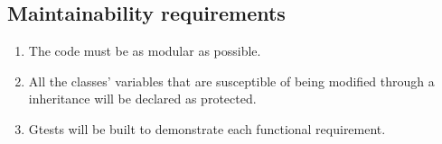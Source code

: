 \subsection{Maintainability requirements}
\begin{enumerate}[label=\textbf{MR\threedigits*}, leftmargin=2cm]
	\item The code must be as modular as possible. 
	\item All the classes' variables that are susceptible of being modified through a inheritance will be declared as protected. 
	\item Gtests will be built to demonstrate each functional requirement. 
	
\end{enumerate}





